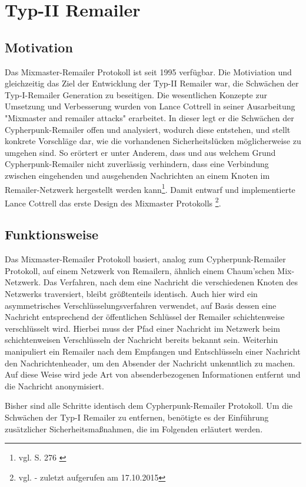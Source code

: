 \chapter{Typ-II Remailer}
\section{Motivation}
Das Mixmaster-Remailer Protokoll ist seit 1995 verfügbar. Die Motiviation und gleichzeitig das Ziel der Entwicklung der Typ-II Remailer war, die Schwächen der Typ-I-Remailer Generation zu beseitigen. Die wesentlichen Konzepte zur Umsetzung und Verbesserung wurden von Lance Cottrell in seiner Ausarbeitung "{}Mixmaster and remailer attacks"{} erarbeitet. In dieser legt er die Schwächen der Cypherpunk-Remailer offen und analysiert, wodurch diese entstehen, und stellt konkrete Vorschläge dar, wie die vorhandenen Sicherheitslücken möglicherweise zu umgehen sind. So erörtert er unter Anderem, dass und aus welchem Grund Cypherpunk-Remailer nicht zuverlässig verhindern, dass eine Verbindung zwischen eingehenden und ausgehenden Nachrichten an einem Knoten im Remailer-Netzwerk hergestellt werden kann\footnote{vgl. S. 276 \cite{oram2001peer}}. Damit entwarf und implementierte Lance Cottrell das erste Design des Mixmaster Protokolls \footnote{vgl. \cite{mixmastermanpage} - zuletzt aufgerufen am 17.10.2015}.

\section{Funktionsweise}
Das Mixmaster-Remailer Protokoll basiert, analog zum Cypherpunk-Remailer Protokoll, auf einem Netzwerk von Remailern, ähnlich einem Chaum'schen Mix-Netzwerk. Das Verfahren, nach dem eine Nachricht die verschiedenen Knoten des Netzwerks traversiert, bleibt größtenteils identisch. Auch hier wird ein asymmetrisches Verschlüsselungsverfahren verwendet, auf Basis dessen eine Nachricht entsprechend der öffentlichen Schlüssel der Remailer schichtenweise verschlüsselt wird. Hierbei muss der Pfad einer Nachricht im Netzwerk beim schichtenweisen Verschlüsseln der Nachricht bereits bekannt sein. Weiterhin manipuliert ein Remailer nach dem Empfangen und Entschlüsseln einer Nachricht den Nachrichtenheader, um den Absender der Nachricht unkenntlich zu machen. Auf diese Weise wird jede Art von absenderbezogenen Informationen entfernt und die Nachricht anonymisiert. 

Bisher sind alle Schritte identisch dem Cypherpunk-Remailer Protokoll. Um die Schwächen der Typ-I Remailer zu entfernen, benötigte es der Einführung zusätzlicher Sicherheitsmaßnahmen, die im Folgenden erläutert werden.

